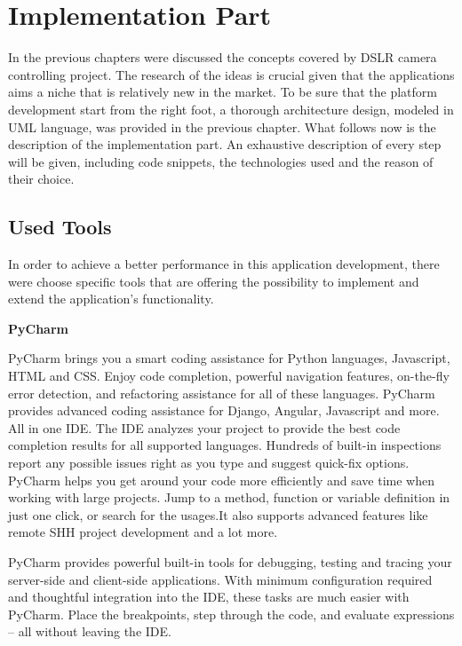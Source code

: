 \section{Implementation Part}

In the previous chapters were discussed the concepts covered by DSLR camera controlling project. The research of the ideas is crucial given that the applications aims a niche that is relatively new in the market. To be sure that the platform development start from the right foot, a thorough architecture design, modeled in UML language, was provided in the previous chapter. What follows now is the description of the implementation part. An exhaustive description of every step will be given, including code snippets, the technologies used and the reason of their choice.

\subsection{Used Tools}
In order to achieve a better performance in this application development, there were choose specific tools that are offering the possibility to implement and extend the application's functionality.

\vspace{0.3cm}
\textbf{PyCharm}

PyCharm brings you a smart coding assistance for Python languages, Javascript, HTML and CSS. Enjoy code completion, powerful navigation features, on-the-fly error detection, and refactoring assistance for all of these languages. PyCharm provides advanced coding assistance for Django, Angular, Javascript and more. All in one IDE. The IDE analyzes your project to provide the best code completion results for all supported languages. Hundreds of built-in inspections report any possible issues right as you type and suggest quick-fix options. PyCharm helps you get around your code more efficiently and save time when working with large projects. Jump to a method, function or variable definition in just one click, or search for the usages.It also supports advanced features like remote SHH project development and a lot more.

PyCharm provides powerful built-in tools for debugging, testing and tracing your server-side and client-side applications. With minimum configuration required and thoughtful integration into the IDE, these tasks are much easier with PyCharm. Place the breakpoints, step through the code, and evaluate expressions – all without leaving the IDE.

